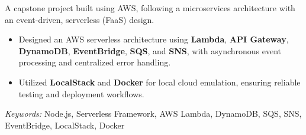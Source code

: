 \noindent
{}

\noindent
A capstone project built using AWS, following a microservices architecture with an event-driven, serverless (FaaS) design.

\begin{itemize}
    \item Designed an AWS serverless architecture using \textbf{Lambda}, \textbf{API Gateway}, \textbf{DynamoDB}, \textbf{EventBridge}, \textbf{SQS}, and \textbf{SNS}, with asynchronous event processing and centralized error handling.
    \item Utilized \textbf{LocalStack} and \textbf{Docker} for local cloud emulation, ensuring reliable testing and deployment workflows.
\end{itemize}

\noindent
\textit{Keywords:} Node.js, Serverless Framework, AWS Lambda, DynamoDB, SQS, SNS, EventBridge, LocalStack, Docker
